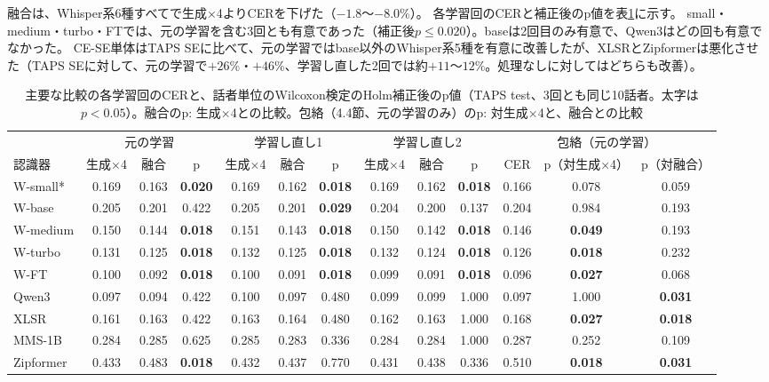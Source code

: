 \documentclass[xelatex,ja=standard,a4paper,twocolumn,10pt]{bxjsarticle}
\makeatletter
\renewcommand{\subsection}{\@startsection{subsection}{2}{\z@}{.7ex plus .2ex}{.3ex}{\normalfont\normalsize\sffamily\bfseries}}
\makeatother
\begin{document}
\subsection{ASR損失は何を足すか}
融合は、Whisper系6種すべてで生成×4よりCERを下げた（$-1.8$〜$-8.0$\%）。
各学習回のCERと補正後のp値を表\ref{tab:stat}に示す。
small・medium・turbo・FTでは、元の学習を含む3回とも有意であった（補正後$p\le0.020$）。baseは2回目のみ有意で、Qwen3はどの回も有意でなかった。
CE-SE単体はTAPS SEに比べて、元の学習ではbase以外のWhisper系5種を有意に改善したが、XLSRとZipformerは悪化させた（TAPS SEに対して、元の学習で$+26$\%・$+46$\%、学習し直した2回では約$+11$〜$12$\%。処理なしに対してはどちらも改善）。

\begin{table}[t]
  \centering
  \caption{主要な比較の各学習回のCERと、話者単位のWilcoxon検定のHolm補正後のp値（TAPS test、3回とも同じ10話者。太字は$p<0.05$）。融合のp: 生成×4との比較。包絡（4.4節、元の学習のみ）のp: 対生成×4と、融合との比較}
  \label{tab:stat}
  \footnotesize
  \setlength{\tabcolsep}{3.0pt}
  \begin{tabular}{l ccc ccc ccc ccc}
    \toprule
    & \multicolumn{3}{c}{元の学習} & \multicolumn{3}{c}{学習し直し1} & \multicolumn{3}{c}{学習し直し2} & \multicolumn{3}{c}{包絡（元の学習）} \\
    \cmidrule(lr){2-4}\cmidrule(lr){5-7}\cmidrule(lr){8-10}\cmidrule(lr){11-13}
    認識器 & 生成×4 & 融合 & p & 生成×4 & 融合 & p & 生成×4 & 融合 & p & CER & p（対生成×4） & p（対融合） \\
    \midrule
    W-small* & 0.169 & 0.163 & \textbf{0.020} & 0.169 & 0.162 & \textbf{0.018} & 0.169 & 0.162 & \textbf{0.018} & 0.166 & 0.078 & 0.059 \\
    W-base & 0.205 & 0.201 & 0.422 & 0.205 & 0.201 & \textbf{0.029} & 0.204 & 0.200 & 0.137 & 0.204 & 0.984 & 0.193 \\
    W-medium & 0.150 & 0.144 & \textbf{0.018} & 0.151 & 0.143 & \textbf{0.018} & 0.150 & 0.142 & \textbf{0.018} & 0.146 & \textbf{0.049} & 0.193 \\
    W-turbo & 0.131 & 0.125 & \textbf{0.018} & 0.132 & 0.125 & \textbf{0.018} & 0.132 & 0.124 & \textbf{0.018} & 0.126 & \textbf{0.018} & 0.232 \\
    W-FT & 0.100 & 0.092 & \textbf{0.018} & 0.100 & 0.091 & \textbf{0.018} & 0.099 & 0.091 & \textbf{0.018} & 0.096 & \textbf{0.027} & 0.068 \\
    Qwen3 & 0.097 & 0.094 & 0.422 & 0.100 & 0.097 & 0.480 & 0.099 & 0.099 & 1.000 & 0.097 & 1.000 & \textbf{0.031} \\
    \midrule
    XLSR & 0.161 & 0.163 & 0.422 & 0.163 & 0.164 & 0.480 & 0.162 & 0.163 & 1.000 & 0.168 & \textbf{0.027} & \textbf{0.018} \\
    MMS-1B & 0.284 & 0.285 & 0.625 & 0.285 & 0.283 & 0.336 & 0.284 & 0.284 & 1.000 & 0.287 & 0.252 & 0.109 \\
    Zipformer & 0.433 & 0.483 & \textbf{0.018} & 0.432 & 0.437 & 0.770 & 0.431 & 0.438 & 0.336 & 0.510 & \textbf{0.018} & \textbf{0.031} \\
    \bottomrule
  \end{tabular}
\end{table}
\end{document}
